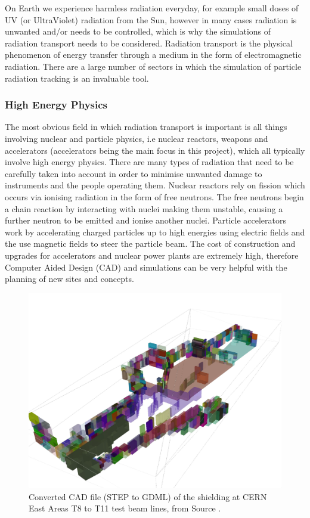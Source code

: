 \documentclass[12pt,a4paper]{article}
\begin{document}
\noindent On Earth we experience harmless radiation everyday, for example small doses of UV (or UltraViolet) radiation from the Sun, however in many cases radiation is unwanted and/or needs to be controlled, which is why the simulations of radiation transport needs to be considered. Radiation transport is the physical phenomenon of energy transfer through a medium in the form of electromagnetic radiation. There are a large number of sectors in which the simulation of particle radiation tracking is an invaluable tool.

\subsubsection{High Energy Physics}
\noindent The most obvious field in which radiation transport is important is all things involving nuclear and particle physics, i.e nuclear reactors, weapons and accelerators (accelerators being the main focus in this project), which all typically involve high energy physics. There are many types of radiation that need to be carefully taken into account in order to minimise unwanted damage to instruments and the people operating them. Nuclear reactors rely on fission which occurs via ionising radiation in the form of free neutrons. The free neutrons begin a chain reaction by interacting with nuclei making them unstable, causing a further neutron to be emitted and ionise another nuclei. Particle accelerators work by accelerating charged particles up to high energies using electric fields and the use magnetic fields to steer the particle beam. The cost of construction and upgrades for accelerators and nuclear power plants are extremely high, therefore Computer Aided Design (CAD) and simulations can be very helpful with the planning of new sites and concepts. 

\begin{figure}[h!]
\centering
\includegraphics[scale=0.13]{Images//introduction//CernEast.jpg}
\caption[width=\columnwidth]{Converted CAD file (STEP to GDML) of the shielding at CERN East Areas T8 to T11 test beam lines, from Source \cite{pyg4om}.}
\label{cerncad}
\end{figure}
\end{document}
